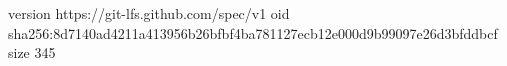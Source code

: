 version https://git-lfs.github.com/spec/v1
oid sha256:8d7140ad4211a413956b26bfbf4ba781127ecb12e000d9b99097e26d3bfddbcf
size 345
